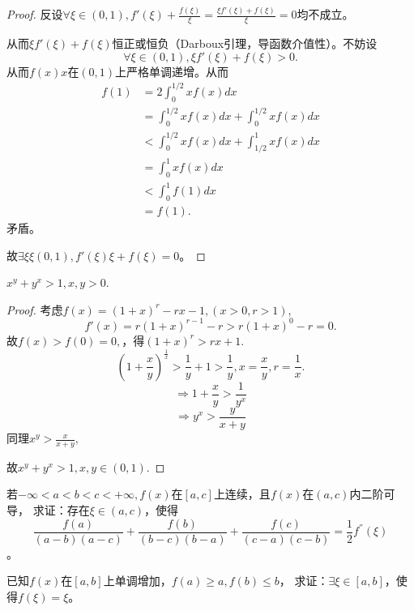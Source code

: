   \begin{proof}
  反设$\forall\xi\in(0,1),f'(\xi)+\frac{f(\xi)}{\xi}=\frac{\xi f'(\xi)+f(\xi)}{\xi}=0$均不成立。
  
  从而$\xi f'(\xi)+f(\xi)$恒正或恒负（Darboux引理，导函数介值性）。不妨设
  $$\forall\xi\in(0,1),\xi f'(\xi)+f(\xi)>0.$$
  从而$f(x)x$在$(0,1)$上严格单调递增。从而
  \[
  \begin{aligned}
  f(1)&=2\int_0^{1/2}xf(x)dx\\
  &=\int_0^{1/2}xf(x)dx+\int_0^{1/2}xf(x)dx\\
  &<\int_0^{1/2}xf(x)dx+\int_{1/2}^1xf(x)dx\\
  &=\int_0^1xf(x)dx\\
  &<\int_0^1f(1)dx\\
  &=f(1).
  \end{aligned}
  \]
  矛盾。
  
  故$\exists\xi\xi(0,1),f'(\xi)\xi+f(\xi)=0$。
  \end{proof}
  
  \begin{example}
  $x^y+y^x>1,x,y>0$.
  \end{example}
  
  \begin{proof}
  考虑$f(x)=(1+x)^r-rx-1,(x>0,r>1)$,
  $$f'(x)=r(1+x)^{r-1}-r>r(1+x)^0-r=0.$$
  故$f(x)>f(0)=0,$，得$(1+x)^r>rx+1.$
  $$(1+\frac{x}{y})^{\frac1x}>\frac1y+1>\frac1y,x=\frac xy,r=\frac1x.$$
  $$\Longrightarrow 1+\frac xy>\frac{1}{y^x}$$
  $$\Longrightarrow y^x>\frac{y}{x+y}$$
  同理$x^y>\frac{x}{x+y},$
  
  故$x^y+y^x>1,x,y\in(0,1).$ 
  \end{proof}
  
  \begin{example}
   若$-\infty<a<b<c<+\infty,f(x)$在$[a,c]$上连续，且$f(x)$在$(a,c)$内二阶可导，
   求证：存在$\xi\in(a,c)$，使得$$\frac{f(a)}{(a-b)(a-c)}+\frac{f(b)}{(b-c)(b-a)}+\frac{f(c)}{(c-a)(c-b)}=\frac12f^{''}(\xi)$$。
\end{example}

\begin{example}
  已知$f(x)$在$[a,b]$上单调增加，$f(a)\geq a,f(b)\leq b$，
  求证：$\exists\xi\in[a,b]$，使得$f(\xi)=\xi$。
\end{example}

